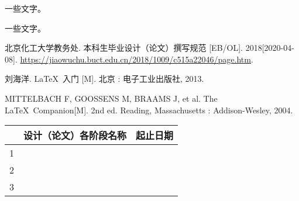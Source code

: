 \begin{taskbook}
\taskinfo		%

一些文字。

一些文字。


\begin{bibenumerate}
	\item 北京化工大学教务处. 本科生毕业设计（论文）撰写规范 [EB/OL]. 2018[2020-04-08]. \url{https://jiaowuchu.buct.edu.cn/2018/1009/c515a22046/page.htm}.
	\item 刘海洋. \LaTeX\ 入门 [M]. 北京 : 电子工业出版社, 2013.
	\item MITTELBACH F, GOOSSENS M, BRAAMS J, et al. The \LaTeX\ Companion[M]. 2nd ed. Reading, Massachusetts : Addison-Wesley, 2004.
	\item 
\end{bibenumerate}


\begin{table}[ht]
	\centering
	\begin{tabularx}{.95\textwidth}{p{1.5em}Xp{6em}}
		\toprule
				& 	设计（论文）各阶段名称		  &		起止日期	\\\midrule
			1	& 								&				\\\hline
			2	&								&				\\\hline
			3	&								&				\\
		\bottomrule
	\end{tabularx}
\end{table}

\end{taskbook}